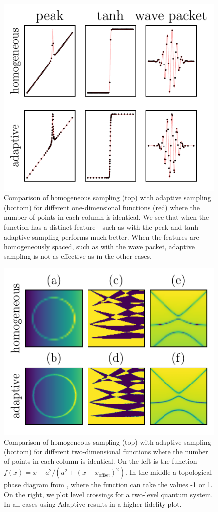 \begin{figure}
\centering
\includegraphics{chapter_adaptive/figures/Learner1D.pdf}
\caption{Comparison of homogeneous sampling (top) with adaptive sampling (bottom) for different one-dimensional functions (red) where the number of points in each column is identical.
We see that when the function has a distinct feature---such as with the peak and tanh---adaptive sampling performs much better.
When the features are homogeneously spaced, such as with the wave packet, adaptive sampling is not as effective as in the other cases.\label{fig:Learner1D}}
\end{figure}

\begin{figure}
\centering
\includegraphics{chapter_adaptive/figures/Learner2D.pdf}
\caption{Comparison of homogeneous sampling (top) with adaptive sampling (bottom) for different two-dimensional functions where the number of points in each column is identical.
On the left is the function $f(x) = x + a ^ 2 / (a ^ 2 + (x - x_\textrm{offset}) ^ 2)$.
In the middle a topological phase diagram from \cite{Nijholt2016}, where the function can take the values -1 or 1.
On the right, we plot level crossings for a two-level quantum system.
In all cases using Adaptive results in a higher fidelity plot.\label{fig:Learner2D}}
\end{figure}

